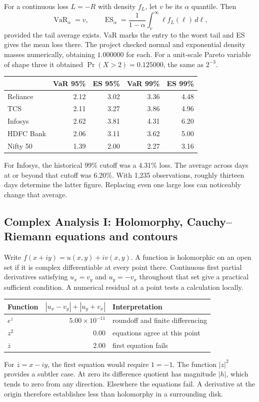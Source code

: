 \documentclass[12pt,a4paper]{article}
\newcommand{\topic}[1]{\clearpage\subsection{#1}}
\begin{document}
For a continuous loss $L=-R$ with density $f_L$, let $v$ be its $\alpha$ quantile. Then
\[
 \operatorname{VaR}_{\alpha}=v,\qquad
 \operatorname{ES}_{\alpha}=\frac{1}{1-\alpha}\int_v^\infty \ell f_L(\ell)\,d\ell ,
\]
provided the tail average exists. VaR marks the entry to the worst tail and ES gives the mean loss there. The project checked normal and exponential density masses numerically, obtaining $1.000000$ for each. For a unit-scale Pareto variable of shape three it obtained $\Pr(X>2)=0.125000$, the same as $2^{-3}$.
\begin{center}\begin{tabular}{lrrrr}\toprule
&VaR 95\% &ES 95\% &VaR 99\% &ES 99\%\\\midrule
Reliance&2.12&3.02&3.36&4.48\\
TCS&2.11&3.27&3.86&4.96\\
Infosys&2.62&3.81&4.31&6.20\\
HDFC Bank&2.06&3.11&3.62&5.00\\
Nifty 50&1.39&2.00&2.27&3.16\\\bottomrule\end{tabular}\par\nopagebreak{}\end{center}
For Infosys, the historical 99\% cutoff was a 4.31\% loss. The average across days at or beyond that cutoff was 6.20\%. With 1,235 observations, roughly thirteen days determine the latter figure. Replacing even one large loss can noticeably change that average.
\topic{Complex Analysis I: Holomorphy, Cauchy--Riemann equations and contours}
Write $f(x+iy)=u(x,y)+iv(x,y)$. A function is holomorphic on an open set if it is complex differentiable at every point there. Continuous first partial derivatives satisfying $u_x=v_y$ and $u_y=-v_x$ throughout that set give a practical sufficient condition. A numerical residual at a point tests a calculation locally.
\begin{center}\begin{tabular}{lrl}\toprule
Function & $|u_x-v_y|+|u_y+v_x|$ & Interpretation\\\midrule
$e^z$ & $5.00\times10^{-11}$ & roundoff and finite differencing\\
$z^2$ & $0.00$ & equations agree at this point\\
$\overline z$ & $2.00$ & first equation fails\\\bottomrule\end{tabular}\par\nopagebreak{}\end{center}
For $\overline z=x-iy$, the first equation would require $1=-1$. The function $|z|^2$ provides a subtler case. At zero its difference quotient has magnitude $|h|$, which tends to zero from any direction. Elsewhere the equations fail. A derivative at the origin therefore establishes less than holomorphy in a surrounding disk.
 
\end{document}
